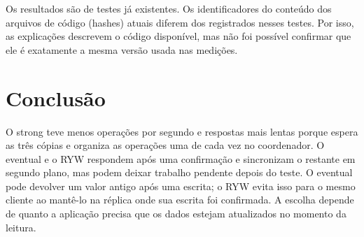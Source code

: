 Os resultados são de testes já existentes. Os identificadores do conteúdo
dos arquivos de código (hashes) atuais diferem dos registrados nesses testes.
Por isso, as explicações descrevem o código disponível, mas não foi possível
confirmar que ele é exatamente a mesma versão usada nas medições.

\section{Conclusão}
O strong teve menos operações por segundo e respostas mais lentas porque
espera as três cópias e organiza as operações uma de cada vez no coordenador.
O eventual e o RYW respondem após uma confirmação e sincronizam o restante
em segundo plano, mas podem deixar trabalho pendente depois do teste.
O eventual pode devolver um valor antigo após uma escrita; o RYW evita isso
para o mesmo cliente ao mantê-lo na réplica onde sua escrita foi confirmada.
A escolha depende de quanto a aplicação precisa que os dados estejam
atualizados no momento da leitura.
